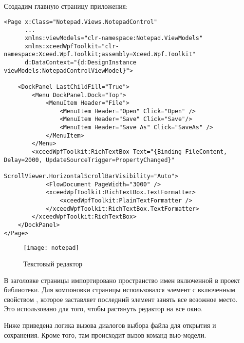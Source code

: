 \documentclass[a4paper,14pt]{extarticle}
\begin{document}
Создадим главную страницу приложения:

\begin{lstlisting}
<Page x:Class="Notepad.Views.NotepadControl"
      ...
      xmlns:viewModels="clr-namespace:Notepad.ViewModels"
      xmlns:xceedWpfToolkit="clr-namespace:Xceed.Wpf.Toolkit;assembly=Xceed.Wpf.Toolkit"
      d:DataContext="{d:DesignInstance viewModels:NotepadControlViewModel}">

    <DockPanel LastChildFill="True">
        <Menu DockPanel.Dock="Top">
            <MenuItem Header="File">
                <MenuItem Header="Open" Click="Open" />
                <MenuItem Header="Save" Click="Save"/>
                <MenuItem Header="Save As" Click="SaveAs" />
            </MenuItem>
        </Menu>
        <xceedWpfToolkit:RichTextBox Text="{Binding FileContent, Delay=2000, UpdateSourceTrigger=PropertyChanged}"
                                     ScrollViewer.HorizontalScrollBarVisibility="Auto">
            <FlowDocument PageWidth="3000" />
            <xceedWpfToolkit:RichTextBox.TextFormatter>
                <xceedWpfToolkit:PlainTextFormatter />
            </xceedWpfToolkit:RichTextBox.TextFormatter>
        </xceedWpfToolkit:RichTextBox>
    </DockPanel>
</Page>
\end{lstlisting}

\begin{figure}[H]
    \centering
    \texttt{[image: notepad]}
    \caption{Текстовый редактор}
    \label{fig:notepad}
\end{figure}

В заголовке страницы импортировано пространство имен включенной в проект библиотеки.
Для компоновки страницы использовался элемент  с включенным свойством
, которое заставляет последний элемент занять все возожное место.
Это использовано для того, чтобы растянуть редактор на все окно.

Ниже приведена логика вызова диалогов выбора файла для открытия и сохранения. Кроме того,
там происходит вызов команд вью-модели.
\end{document}
